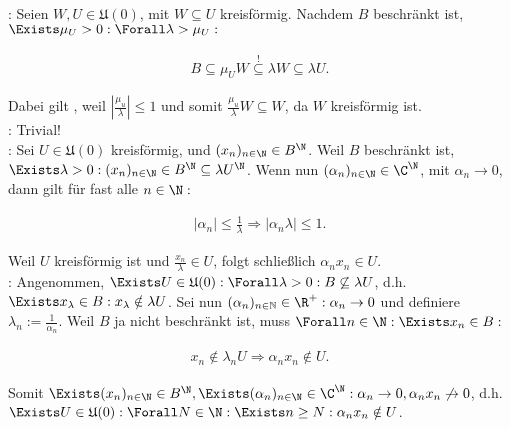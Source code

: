 \begin{solution}

:
Seien $W, U \in \mathfrak{U}(0)$, mit $W \subseteq U$ kreisförmig.
Nachdem $B$ beschränkt ist, $\Exists \mu_U > 0: \Forall \lambda > \mu_U:$

\begin{align*}
  B
  \subseteq
  \mu_U W
  \stackrel{!}{\subseteq}
  \lambda W
  \subseteq
  \lambda U.
\end{align*}

Dabei gilt \Quote{!}, weil $|\frac{\mu_u}{\lambda}| \leq 1$ und somit $\frac{\mu_u}{\lambda} W \subseteq W$, da $W$ kreisförmig ist. \\

:
Trivial! \\

:
Sei $U \in \mathfrak{U}(0)$ kreisförmig, und $(x_n)_{n \in \N} \in B^\N$.
Weil $B$ beschränkt ist, $\Exists \lambda > 0: (x_n)_{n \in \N} \in B^\N \subseteq \lambda U^\N$.
Wenn nun $(\alpha_n)_{n \in \N} \in \C^\N$, mit $\alpha_n \to 0$, dann gilt für fast alle $n \in \N:$

\begin{align*}
  |\alpha_n| \leq \frac{1}{\lambda}
  \Rightarrow
  |\alpha_n \lambda| \leq 1.
\end{align*}

Weil $U$ kreisförmig ist und $\frac{x_n}{\lambda} \in U$, folgt schließlich $\alpha_n x_n \in U$. \\

:
Angenommen, $\Exists U \in \mathfrak{U}(0): \Forall \lambda > 0: B \not \subseteq \lambda U$, d.h. $\Exists x_\lambda \in B: x_\lambda \notin \lambda U$.
Sei nun $(\alpha_n)_{n\in\mathbb{N}} \in \R^+: \alpha_n \to 0$ und definiere $\lambda_n := \frac{1}{\alpha_n}$.
Weil $B$ ja nicht beschränkt ist, muss $\Forall n \in \N: \Exists x_n \in B:$

\begin{align*}
  x_n \notin \lambda_n U
  \Rightarrow
  \alpha_n x_n \notin U.
\end{align*}

Somit $\Exists (x_n)_{n \in \N} \in B^\N, \Exists (\alpha_n)_{n \in \N} \in \C^\N: \alpha_n \to 0, \alpha_n x_n \not \to 0$, d.h. $\Exists U \in \mathfrak{U}(0): \Forall N \in \N: \Exists n \geq N: \alpha_n x_n \notin U$.

\end{solution}
